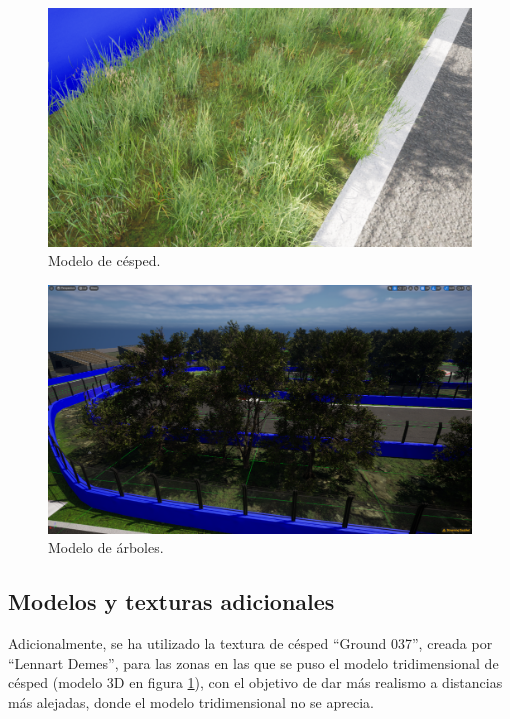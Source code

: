 \begin{figure}[H]
    \centering
    \includegraphics[width=\textwidth]{imagenes/cesped.png}
    \caption{Modelo de césped.}
    \label{fig:cesped}
\end{figure}

\begin{figure}[H]
    \centering
    \includegraphics[width=\textwidth]{imagenes/arboles.png}
    \caption{Modelo de árboles.}
    \label{fig:arboles}
\end{figure}

\subsection{Modelos y texturas adicionales}

Adicionalmente, se ha utilizado la textura de césped ``Ground 037''\cite{grasstexture}, creada por ``Lennart Demes'', para las zonas en las que se puso el modelo tridimensional de césped (modelo 3D en figura \ref{fig:cesped}), con el objetivo de dar más realismo a distancias más alejadas, donde el modelo tridimensional no se aprecia.

